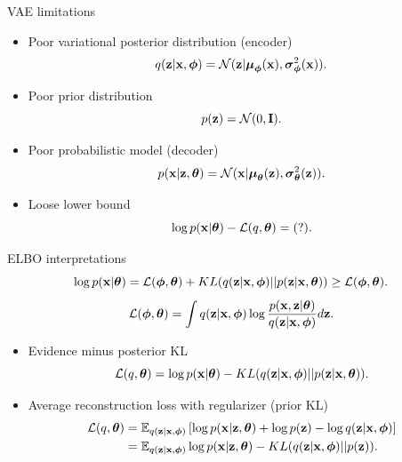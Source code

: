 \begin{frame}{VAE limitations}
	\begin{itemize}
		\item Poor variational posterior distribution (encoder)
		\[
			q(\bz | \bx, \bphi) = \mathcal{N}(\bz| \bmu_{\bphi}(\bx), \bsigma^2_{\bphi}(\bx)).
		\]
		\item Poor prior distribution
		\[
			p(\bz) = \mathcal{N}(0, \mathbf{I}).
		\]
		\item Poor probabilistic model (decoder)
		\[
			p(\bx | \bz, \btheta) = \mathcal{N}(\bx| \bmu_{\btheta}(\bz), \bsigma^2_{\btheta}(\bz)).
		\]
		\item Loose lower bound
		\[
			\log p(\bx | \btheta) - \mathcal{L}(q, \btheta) = (?).
		\]
	\end{itemize}
\end{frame}
\begin{frame}{ELBO interpretations}
	\[
		\log p(\bx | \btheta) = \cL (\bphi, \btheta) + KL(q(\bz | \bx, \bphi) || p(\bz | \bx, \btheta)) \geq  \cL (\bphi, \btheta).
	\]
	\[
		\cL (\bphi, \btheta) = \int q(\bz | \bx, \bphi) \log \frac{p(\bx, \bz | \btheta)}{q(\bz | \bx, \bphi)} d \bz.
	\]
	\begin{itemize}
	    \item Evidence minus posterior KL
	    \[
	        \mathcal{L}(q, \btheta) = \log p(\bx | \btheta) - KL(q(\bz | \bx, \bphi) || p(\bz | \bx, \btheta)).
	    \]
	    \item Average reconstruction loss with regularizer (prior KL)
	    \begin{align*}
	        \mathcal{L}(q, \btheta) &= \mathbb{E}_{q(\bz | \bx, \bphi)} \left[ \log p(\bx | \bz, \btheta) + \log p(\bz) - \log q(\bz | \bx, \bphi) \right] \\
	        &= \mathbb{E}_{q(\bz | \bx, \bphi)} \log p(\bx | \bz, \btheta) - KL(q(\bz | \bx, \bphi) || p(\bz)).
	    \end{align*}
	\end{itemize}
\end{frame}
